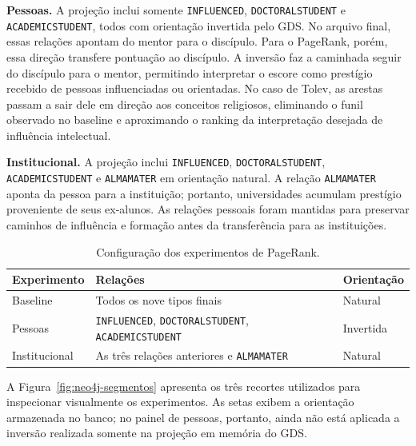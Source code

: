 \documentclass[10pt,a4paper]{article}
\begin{document}
\textbf{Pessoas.} A projeção inclui somente \texttt{INFLUENCED}, \texttt{DOCTORALSTUDENT} e \texttt{ACADEMICSTUDENT}, todos com orientação invertida pelo GDS. No arquivo final, essas relações apontam do mentor para o discípulo. Para o PageRank, porém, essa direção transfere pontuação ao discípulo. A inversão faz a caminhada seguir do discípulo para o mentor, permitindo interpretar o escore como prestígio recebido de pessoas influenciadas ou orientadas. No caso de Tolev, as arestas passam a sair dele em direção aos conceitos religiosos, eliminando o funil observado no baseline e aproximando o ranking da interpretação desejada de influência intelectual.

\textbf{Institucional.} A projeção inclui \texttt{INFLUENCED}, \texttt{DOCTORALSTUDENT}, \texttt{ACADEMICSTUDENT} e \texttt{ALMAMATER} em orientação natural. A relação \texttt{ALMAMATER} aponta da pessoa para a instituição; portanto, universidades acumulam prestígio proveniente de seus ex-alunos. As relações pessoais foram mantidas para preservar caminhos de influência e formação antes da transferência para as instituições.

\begin{table}[htbp]
  \centering
  \caption{Configuração dos experimentos de PageRank.}
  \label{tab:experimentos-pr}
  \begin{tabularx}{\linewidth}{lXl}
    \toprule
    Experimento & Relações & Orientação \\
    \midrule
    Baseline & Todos os nove tipos finais & Natural \\
    Pessoas & \texttt{INFLUENCED}, \texttt{DOCTORALSTUDENT}, \texttt{ACADEMICSTUDENT} & Invertida \\
    Institucional & As três relações anteriores e \texttt{ALMAMATER} & Natural \\
    \bottomrule
  \end{tabularx}
\end{table}

A Figura~\ref{fig:neo4j-segmentos} apresenta os três recortes utilizados para inspecionar visualmente os experimentos. As setas exibem a orientação armazenada no banco; no painel de pessoas, portanto, ainda não está aplicada a inversão realizada somente na projeção em memória do GDS.
\end{document}
